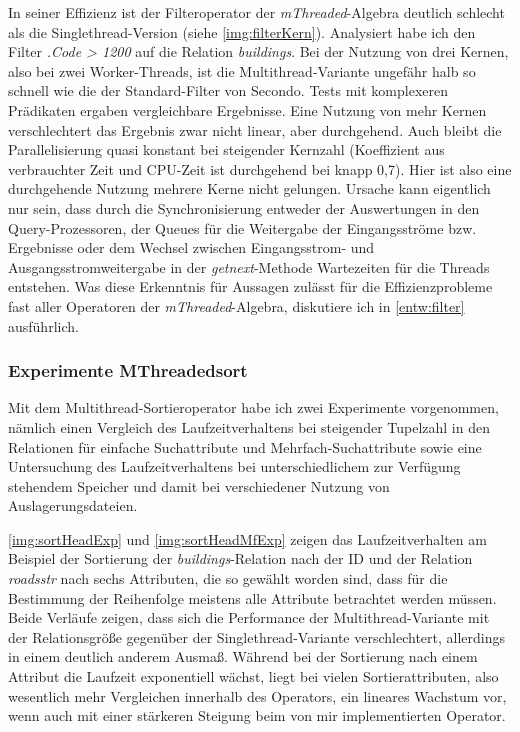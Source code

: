 \documentclass[a4paper,12pt,twoside]{article}
\newcommand{\Fb}[1]{\textit{#1}} %
\begin{document}
{In seiner Effizienz ist der Filteroperator der \Fb{mThreaded}-Algebra deutlich schlecht als die Singlethread-Version (siehe \autoref{img:filterKern}). Analysiert habe ich den Filter \Fb{.Code > 1200} auf die Relation \Fb{buildings}. Bei der Nutzung von drei Kernen, also bei zwei Worker-Threads, ist die Multithread-Variante ungefähr halb so schnell wie die der Standard-Filter von Secondo. Tests mit komplexeren Prädikaten ergaben vergleichbare Ergebnisse. Eine Nutzung von mehr Kernen verschlechtert das Ergebnis zwar nicht linear, aber durchgehend. Auch bleibt die Parallelisierung quasi konstant bei steigender Kernzahl (Koeffizient aus verbrauchter Zeit und CPU-Zeit ist durchgehend bei knapp 0,7). Hier ist also eine durchgehende Nutzung mehrere Kerne nicht gelungen. Ursache kann eigentlich nur sein, dass durch die Synchronisierung entweder der Auswertungen in den Query-Prozessoren, der Queues für die Weitergabe der Eingangsströme bzw. Ergebnisse oder dem Wechsel zwischen Eingangsstrom- und Ausgangsstromweitergabe in der \Fb{getnext}-Methode Wartezeiten für die Threads entstehen. Was diese Erkenntnis für Aussagen zulässt für die Effizienzprobleme fast aller Operatoren der  \Fb{mThreaded}-Algebra, diskutiere ich in \autoref{entw:filter} ausführlich.

\subsubsection{Experimente MThreadedsort}

Mit dem Multithread-Sortieroperator habe ich zwei Experimente vorgenommen, nämlich einen Vergleich des Laufzeitverhaltens bei steigender Tupelzahl in den Relationen für einfache Suchattribute und Mehrfach-Suchattribute sowie eine Untersuchung des Laufzeitverhaltens bei unterschiedlichem zur Verfügung stehendem Speicher und damit bei verschiedener Nutzung von Auslagerungsdateien.

\autoref{img:sortHeadExp} und \autoref{img:sortHeadMfExp} zeigen das Laufzeitverhalten am Beispiel der Sortierung der \Fb{buildings}-Relation nach der ID und der Relation \Fb{roads\-str} nach sechs Attributen, die so gewählt worden sind, dass für die Bestimmung der Reihenfolge meistens alle Attribute betrachtet werden müssen. Beide Verläufe zeigen, dass sich die Performance der Multithread-Variante mit der Relationsgröße gegenüber der Singlethread-Variante verschlechtert, allerdings in einem deutlich anderem Ausmaß. Während bei der Sortierung nach einem Attribut die Laufzeit exponentiell wächst, liegt bei vielen Sortierattributen, also wesentlich mehr Vergleichen innerhalb des Operators, ein lineares Wachstum vor, wenn auch mit einer stärkeren Steigung beim von mir implementierten Operator. 

}
\end{document}
